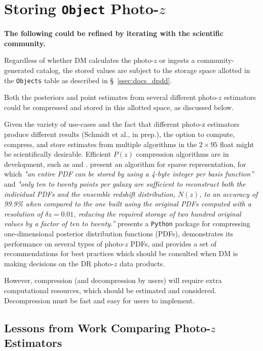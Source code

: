 \documentclass[DM,lsstdraft,toc]{lsstdoc}
\begin{document}
\section{Storing {\tt Object} Photo-$z$}\label{sec:store}

{\bf The following could be refined by iterating with the scientific community.}

Regardless of whether DM calculates the photo-$z$ or ingests a community-generated catalog, the stored values are subject to the storage space allotted in the {\tt Objects} table as described in \S~\ref{ssec:docs_dpdd}.

Both the posteriors and point estimates from several different photo-$z$ estimators could be compressed and stored in this allotted space, as discussed below.

Given the variety of use-cases and the fact that different photo-z estimators produce different results (Schmidt et al., in prep.), the option to compute, compress, and store estimates from multiple algorithms in the $2\times95$ float might be scientifically desirable.
Efficient $P(z)$ compression algorithms are in development, such as \citet{2014MNRAS.441.3550C} and \citet{2018AJ....156...35M}.
\citet{2014MNRAS.441.3550C} present an algorithm for sparse representation, for which {\it "an entire PDF can be stored by using a 4-byte integer per basis function''} and {\it "only ten to twenty points per galaxy are sufficient to reconstruct both the individual PDFs and the ensemble redshift distribution, $N(z)$, to an accuracy of 99.9\% when compared to the one built using the original PDFs computed with a resolution of $\delta z = 0.01$, reducing the required storage of two hundred original values by a factor of ten to twenty.''} 
\citet{2018AJ....156...35M} presents a {\tt Python} package for compressing one-dimensional posterior distribution functions (PDFs), demonstrates its performance on several types of photo-$z$ PDFs, and provides a set of recommendations for best practices which should be consulted when DM is making decisions on the DR photo-$z$ data products.

However, compression (and decompression by users) will require extra computational resources, which should be estimated and considered.
Decompression must be fast and easy for users to implement.




\subsection{Lessons from Work Comparing Photo-$z$ Estimators}\label{ssec:sel_lit}
\end{document}
